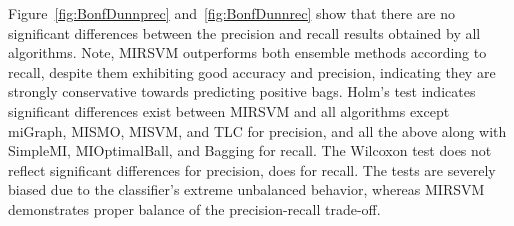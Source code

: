 \documentclass[reqno]{vcuthesis}
\numberwithin{equation}{chapter}
\begin{document}
\begin{table}[H]
{}\vspace{-1.8em}
\label{fig:BonfDunnprec}\vspace{-1.3em}
\label{tab:statprec}
\scriptsize
{}
\end{table}
Figure~\ref{fig:BonfDunnprec} and~\ref{fig:BonfDunnrec} show that there are no significant differences between the precision and recall results obtained by all algorithms. Note, MIRSVM outperforms both ensemble methods according to recall, despite them exhibiting good accuracy and precision, indicating they are strongly conservative towards predicting positive bags. Holm's test indicates significant differences exist between MIRSVM and all algorithms except miGraph, MISMO, MISVM, and TLC for precision, and all the above along with SimpleMI, MIOptimalBall, and Bagging for recall. The Wilcoxon test does not reflect significant differences for precision, does for recall. The tests are severely biased due to the classifier's extreme unbalanced behavior, whereas MIRSVM demonstrates proper balance of the precision-recall trade-off.
\end{document}
